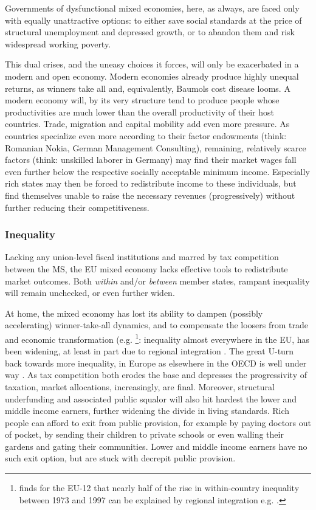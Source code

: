 \documentclass[11pt,a4paper,oneside]{article}
\begin{document}
Governments of dysfunctional mixed economies, here, as always, are faced only with equally unattractive options: 
to either save social standards at the price of structural unemployment and depressed growth, or to abandon them and risk widespread working poverty.

This dual crises, and the uneasy choices it forces, will only be exacerbated in a modern and open economy. 
Modern economies already produce highly unequal returns, as winners take all and, equivalently, Baumols cost disease looms. 
A modern economy will, by its very structure tend to produce people whose productivities are much lower than the overall productivity of their host countries. 
Trade, migration and capital mobility add even more pressure. 
As countries specialize even more according to their factor endowments (think: Romanian Nokia, German Management Consulting), remaining, relatively scarce factors (think: unskilled laborer in Germany) may find their market wages fall even further below the respective socially acceptable minimum income. 
Especially rich states may then be forced to redistribute income to these individuals, but find themselves unable to raise the necessary revenues (progressively) without further reducing their competitiveness. 


\subsubsection{Inequality} 
Lacking any union-level fiscal institutions and marred by tax competition between the \gls{MS}, the \gls{EU} mixed economy lacks effective tools to redistribute market outcomes. 
Both \emph{within} and/or \emph{between} member states, rampant inequality will remain unchecked, or even further widen.

At home, the mixed economy has lost its ability to dampen (possibly accelerating) winner-take-all dynamics, and to compensate the loosers from trade and economic transformation (e.g. \citealt{Beckfield2006}
	\footnote{
		\citeauthor{Beckfield2006} finds for the \gls{EU}-12 that nearly half of the rise in within-country inequality between 1973 and 1997 can be explained by regional integration e.g. \citeyearpar[979]{Beckfield2006}.
	}: 
inequality almost everywhere in the \gls{EU}, has been widening, at least in part due to regional integration \citep[e.g.][265]{DaudUngl2008}. 
The great U-turn back towards more inequality, in Europe as elsewhere in the \gls{OECD} is well under way \citep{AldersonNielsen-2002-aa}. 
As tax competition both erodes the base and depresses the progressivity of taxation, market allocations, increasingly, are final. 
Moreover, structural underfunding and associated public squalor will also hit hardest the lower and middle income earners, further widening the divide in living standards. 
Rich people can afford to exit from public provision, for example by paying doctors out of pocket, by sending their children to private schools or even walling their gardens and gating their communities. 
Lower and middle income earners have no such exit option, but are stuck with decrepit public provision.
\end{document}
